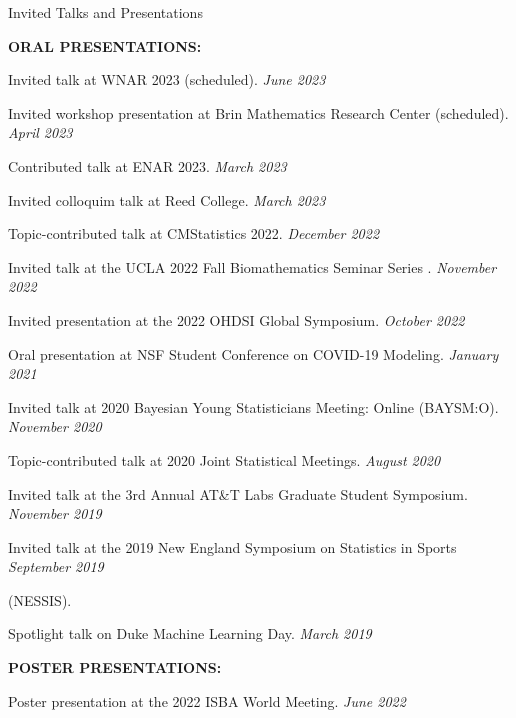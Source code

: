 \documentclass{resume} %
\begin{document}
\begin{rSection}{Invited Talks and Presentations}

\textbf{ORAL PRESENTATIONS:}

Invited talk at WNAR 2023 (scheduled). \hfill {\em June 2023}

Invited workshop presentation at Brin Mathematics Research Center  (scheduled). \hfill {\em April 2023}

Contributed talk at ENAR 2023. \hfill {\em March 2023}

Invited colloquim talk at Reed College. \hfill {\em March 2023}

Topic-contributed talk at CMStatistics 2022. \hfill {\em December 2022}

Invited talk at the UCLA 2022 Fall Biomathematics Seminar Series . \hfill {\em November 2022}

Invited presentation at the 2022 OHDSI Global Symposium.  \hfill {\em October 2022}

{Oral presentation at NSF Student Conference on COVID-19 Modeling.} \hfill {\em January 2021}

{Invited talk at 2020 Bayesian Young Statisticians Meeting: Online (BAYSM:O).} \hfill {\em November 2020}

{Topic-contributed talk at 2020 Joint Statistical Meetings. } \hfill {\em August 2020}

{Invited talk at the 3rd Annual AT\&T Labs Graduate Student Symposium.} \hfill {\em November 2019}


{Invited talk at the 2019 New England Symposium on Statistics in Sports} \hfill {\em September 2019}

\vspace{-0.1in}
 (NESSIS).
 
Spotlight talk on Duke Machine Learning Day. \hfill {\em March 2019}




\medskip
\textbf{POSTER PRESENTATIONS:}

Poster presentation at the 2022 ISBA World Meeting. \hfill {\em June 2022}


\end{rSection}
\end{document}
